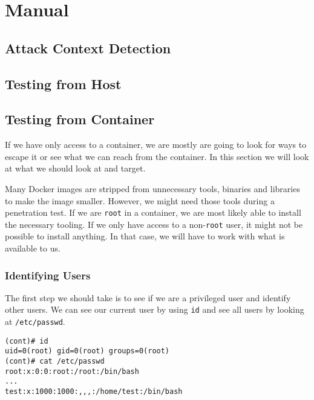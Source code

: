 \section{Manual}

\subsection{Attack Context Detection}

\subsection{Testing from Host}

\subsection{Testing from Container}
If we have only access to a container, we are mostly are going to look for ways to escape it or see what we can reach from the container. In this section we will look at what we should look at and target. 

\hfill

Many Docker images are stripped from unnecessary tools, binaries and libraries to make the image smaller. However, we might need those tools during a penetration test. If we are \lstinline{root} in a container, we are most likely able to install the necessary tooling. If we only have access to a non-\lstinline{root} user, it might not be possible to install anything. In that case, we will have to work with what is available to us.

\subsubsection{Identifying Users}
The first step we should take is to see if we are a privileged user and identify other users. We can see our current user by using \lstinline{id} and see all users by looking at \lstinline{/etc/passwd}.
\begin{lstlisting}
(cont)# id
uid=0(root) gid=0(root) groups=0(root)
(cont)# cat /etc/passwd
root:x:0:0:root:/root:/bin/bash
...
test:x:1000:1000:,,,:/home/test:/bin/bash
\end{lstlisting}

